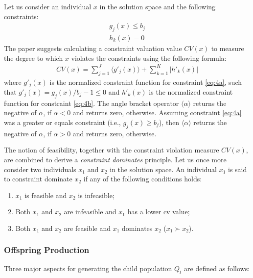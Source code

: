 Let us consider an individual $x$ in the solution space and the following constraints:
\begin{align}
    \tag{constraint 1 }g_j(x) \leq b_j \label{eq:4a}\\
    \tag{constraint 2}h_k(x) = 0 \label{eq:4b}
\end{align}
The paper \parencite{Jain2013AnApproach} suggests calculating a constraint valuation value $CV(x)$ to measure the degree to which $x$ violates the constraints using the following formula:
\begin{align*}
    CV(x) = \sum_{j=1}^J \langle g'_j(x)\rangle + \sum_{k=1}^K \lvert h'_k(x)\rvert
\end{align*}
where $g'_j(x)$ is the normalized constraint function for constraint \ref{eq:4a}, such that $g'_j(x) = g_j(x) / b_j  - 1 \leq 0$ and $h'_k(x)$ is the normalized constraint function for constraint \ref{eq:4b}. The angle bracket operator $\langle \alpha \rangle$ returns the negative of $\alpha$, if $\alpha < 0$ and returns zero, otherwise. Assuming constraint \ref{eq:4a} was a greater or equals constraint (i.e., $g_j(x) \geq b_j$), then $\langle \alpha \rangle$ returns the negative of $\alpha$, if $\alpha > 0$ and returns zero, otherwise.

The notion of feasibility, together with the constraint violation measure $CV(x)$, are combined to derive a \textit{constraint dominates} principle. 
Let us once more consider two individuals $x_1$ and $x_2$ in the solution space. An individual $x_1$ is said to constraint dominate $x_2$ if any of the following conditions holds:
\begin{enumerate}
    \item $x_1$ is feasible and $x_2$ is infeasible;
    \item Both $x_1$ and $x_2$ are infeasible and $x_1$ has a lower \gls{cv} value;
    \item Both $x_1$ and $x_2$ are feasible and $x_1$ dominates $x_2$ ($x_1 \succ x_2$).
\end{enumerate}




\subsubsection{Offspring Production}
Three major aspects for generating the child population $Q_t$ are defined as follows:


